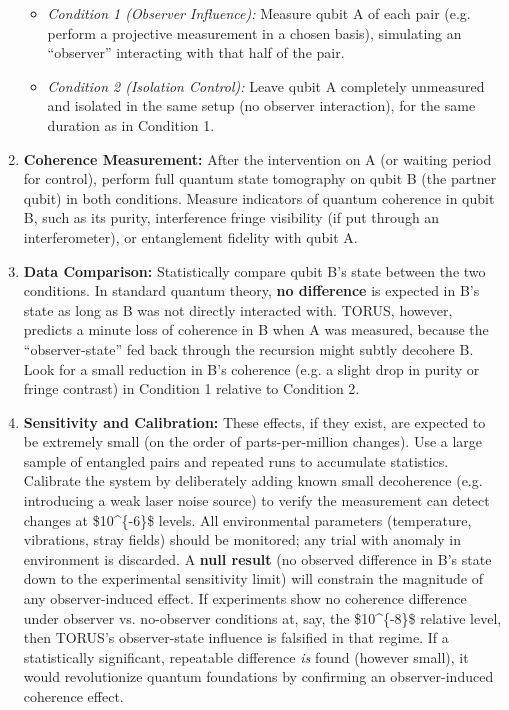 \documentclass[
]{article}
\begin{document}
\begin{enumerate}
  \begin{itemize}
  \item
    \emph{Condition 1 (Observer Influence):} Measure qubit A of each
    pair (e.g. perform a projective measurement in a chosen basis),
    simulating an ``observer'' interacting with that half of the pair.
  \item
    \emph{Condition 2 (Isolation Control):} Leave qubit A completely
    unmeasured and isolated in the same setup (no observer interaction),
    for the same duration as in Condition 1.
  \end{itemize}
\item
  \textbf{Coherence Measurement:} After the intervention on A (or
  waiting period for control), perform full quantum state tomography on
  qubit B (the partner qubit) in both conditions. Measure indicators of
  quantum coherence in qubit B, such as its purity, interference fringe
  visibility (if put through an interferometer), or entanglement
  fidelity with qubit A.
\item
  \textbf{Data Comparison:} Statistically compare qubit B's state
  between the two conditions. In standard quantum theory, \textbf{no
  difference} is expected in B's state as long as B was not directly
  interacted with. TORUS, however, predicts a minute loss of coherence
  in B when A was measured, because the ``observer-state'' fed back
  through the recursion might subtly decohere B\hspace{0pt}. Look for a
  small reduction in B's coherence (e.g. a slight drop in purity or
  fringe contrast) in Condition 1 relative to Condition 2.
\item
  \textbf{Sensitivity and Calibration:} These effects, if they exist,
  are expected to be extremely small (on the order of parts-per-million
  changes)\hspace{0pt}. Use a large sample of entangled pairs and
  repeated runs to accumulate statistics. Calibrate the system by
  deliberately adding known small decoherence (e.g. introducing a weak
  laser noise source) to verify the measurement can detect changes at
  \$10\^{}\{-6\}\$ levels. All environmental parameters (temperature,
  vibrations, stray fields) should be monitored; any trial with anomaly
  in environment is discarded. A \textbf{null result} (no observed
  difference in B's state down to the experimental sensitivity limit)
  will constrain the magnitude of any observer-induced effect. If
  experiments show no coherence difference under observer vs.
  no-observer conditions at, say, the \$10\^{}\{-8\}\$ relative level,
  then TORUS's observer-state influence is falsified in that
  regime\hspace{0pt}. If a statistically significant, repeatable
  difference \emph{is} found (however small), it would revolutionize
  quantum foundations by confirming an observer-induced coherence
  effect\hspace{0pt}.
\end{enumerate}
\end{document}
